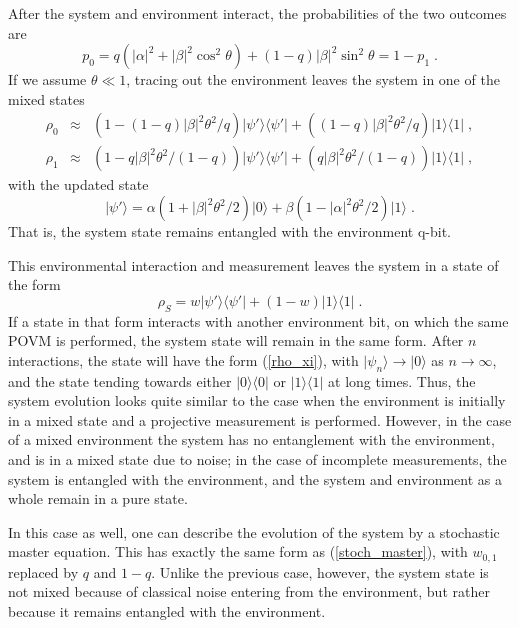 \documentclass[12pt]{article}
\def\bra#1{{\langle #1 |}}
\def\ket#1{{| #1 \rangle}}
\begin{document}
After the system and environment interact, the probabilities of the
two outcomes are
\begin{equation}
p_0 = q (|\alpha|^2 + |\beta|^2 \cos^2\theta)
  + (1-q) |\beta|^2 \sin^2\theta = 1 - p_1 \;.
\end{equation}
If we assume $\theta\ll1$, tracing out the environment leaves the
system in one of the mixed states
\begin{eqnarray}
\rho_0 &\approx&
  \left( 1 - (1-q)|\beta|^2\theta^2/q \right) \ket{\psi'}\bra{\psi'}
  + \left( (1-q)|\beta|^2\theta^2/q \right) \ket1\bra1 \;, \nonumber\\
\rho_1 &\approx&
  \left( 1 - q|\beta|^2\theta^2/(1-q) \right) \ket{\psi'}\bra{\psi'}
  + \left( q|\beta|^2\theta^2/(1-q) \right) \ket1\bra1 \;,
\end{eqnarray}
with the updated state
\begin{equation}
\ket{\psi'} = \alpha(1+|\beta|^2\theta^2/2)\ket0
  + \beta(1-|\alpha|^2\theta^2/2)\ket1 \;.
\end{equation}
That is, the system state remains entangled with the environment q-bit.

This environmental interaction and measurement leaves the system in
a state of the form
\begin{equation}
\rho_S = w \ket{\psi'}\bra{\psi'} + (1-w) \ket1\bra1 \;.
\end{equation}
If a state in that form interacts with another environment bit, on which
the same POVM is performed, the system state will remain in the same form.
After $n$ interactions, the state will have the form (\ref{rho_xi}),
with $\ket{\psi_n}\rightarrow\ket0$ as $n\rightarrow\infty$, and the
state tending towards either $\ket0\bra0$ or $\ket1\bra1$ at long times.
Thus, the system evolution looks quite similar to the case when the
environment is initially in a mixed state and a projective measurement
is performed.  However, in the case of a mixed environment the system
has no entanglement with the environment, and is in a mixed state due to
noise; in the case of incomplete measurements, the system is entangled
with the environment, and the system and environment as a whole remain
in a pure state.

In this case as well, one can describe the evolution of the system by
a stochastic master equation.  This has exactly the same form as
(\ref{stoch_master}), with $w_{0,1}$ replaced by $q$ and $1-q$.  Unlike
the previous case, however, the system state is not mixed because of
classical noise entering from the environment, but rather because it
remains entangled with the environment.
\end{document}
